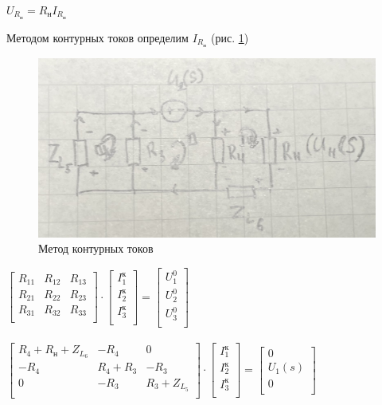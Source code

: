 $ U_{R_н} = R_н I_{R_н} $

Методом контурных токов определим 
$ I_{R_н} $ (рис. \ref{fig:mkt})

\begin{figure}[H]
    \centering
    \includegraphics[width=0.7\linewidth]{photo/mkt}
    \caption{Метод контурных токов}
    \label{fig:mkt}
\end{figure}

$
\begin{bmatrix}
    R_{11} & R_{12} & R_{13}\\
    R_{21} & R_{22} & R_{23}\\
    R_{31} & R_{32} & R_{33}\\
\end{bmatrix}
\cdot
\begin{bmatrix}
    I^к_{1}\\
    I^к_{2}\\
    I^к_{3}\\
\end{bmatrix}
=
\begin{bmatrix}
    U^0_{1}\\
    U^0_{2}\\
    U^0_{3}\\
\end{bmatrix}
$\\\\

$
\begin{bmatrix}
R_4 + R_н + Z_{L_6} & -R_4 & 0\\
-R_4 & R_4 + R_3 & -R_3\\
0 & -R_3 & R_3 + Z_{L_5}\\
\end{bmatrix}
\cdot
\begin{bmatrix}
I^к_{1}\\
I^к_{2}\\
I^к_{3}\\
\end{bmatrix}
=
\begin{bmatrix}
0\\
U_1(s)\\
0\\
\end{bmatrix}
$\\\\

